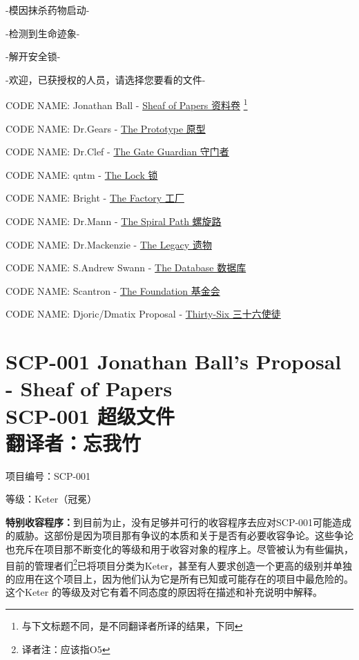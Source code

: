 \documentclass[openany,a4paper]{book} %
\newcounter{mychapter} %
\begin{document}
-模因抹杀药物启动-

-检测到生命迹象-

-解开安全锁-

-欢迎，已获授权的人员，请选择您要看的文件-\vspace{12pt}

CODE NAME: Jonathan Ball - \hyperref[chap:SCP-001-1]{Sheaf of Papers 资料卷} \footnote{与下文标题不同，是不同翻译者所译的结果，下同}

CODE NAME: Dr.Gears - \hyperref[chap:SCP-001-2]{The Prototype 原型}

CODE NAME: Dr.Clef - \hyperref[chap:SCP-001-3]{The Gate Guardian 守门者}

CODE NAME: qntm - \hyperref[chap:SCP-001-4]{The Lock 锁}

CODE NAME: Bright - \hyperref[chap:SCP-001-5]{The Factory 工厂}

CODE NAME: Dr.Mann - \hyperref[chap:SCP-001-6]{The Spiral Path 螺旋路}

CODE NAME: Dr.Mackenzie - \hyperref[chap:SCP-001-7]{The Legacy 遗物}

CODE NAME: S.Andrew Swann - \hyperref[chap:SCP-001-8]{The Database 数据库}

CODE NAME: Scantron - \hyperref[chap:SCP-001-9]{The Foundation 基金会}

CODE NAME: Djoric/Dmatix Proposal - \hyperref[chap:SCP-001-10]{Thirty-Six 三十六使徒}

\addtocounter{mychapter}{1}
\chapter[SCP-001 超级文件]{SCP-001 Jonathan Ball's Proposal - Sheaf of Papers\\SCP-001 超级文件\\ 翻译者：忘我竹}\label{chap:SCP-001-1}

{\Large{项目编号：SCP-001}}\vspace{12pt}

等级：{\color{red}Keter（冠冕）}\vspace{12pt}

\textbf{特别收容程序：}到目前为止，没有足够并可行的收容程序去应对SCP-001可能造成的威胁。这部份是因为项目那有争议的本质和关于是否有必要收容争论。这些争论也充斥在项目那不断变化的等级和用于收容对象的程序上。尽管被认为有些偏执，目前的管理者们\footnote{译者注：应该指O5}已将项目分类为Keter，甚至有人要求创造一个更高的级别并单独的应用在这个项目上，因为他们认为它是所有已知或可能存在的项目中最危险的。这个Keter 的等级及对它有着不同态度的原因将在描述和补充说明中解释。\vspace{12pt}
\end{document}
